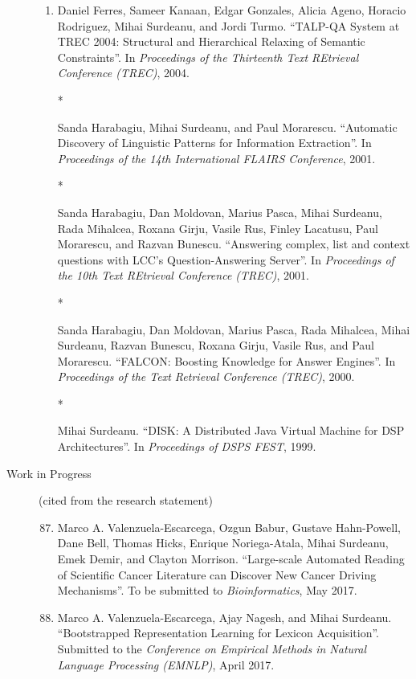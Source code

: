 \documentclass[10pt]{article}
\newcommand{\ve}[1]{{\em #1}} %
\newcommand{\ti}[1]{``#1''} %
\begin{document}
\begin{description}
\begin{enumerate}
\item
Daniel Ferres, Sameer Kanaan, Edgar Gonzales, Alicia Ageno, Horacio Rodriguez, Mihai Surdeanu, and Jordi Turmo.  \ti{TALP-QA System at TREC 2004: Structural and Hierarchical Relaxing of Semantic Constraints}.  In \ve{Proceedings of the Thirteenth Text REtrieval Conference (TREC)}, 2004.

\item
[* \addtocounter{enumi}{1}\theenumi ]
Sanda Harabagiu, Mihai Surdeanu, and Paul Morarescu.  \ti{Automatic Discovery of Linguistic Patterns for Information Extraction}.  In \ve{Proceedings of the 14th International FLAIRS Conference}, 2001.

\item
[* \addtocounter{enumi}{1}\theenumi ]
Sanda Harabagiu, Dan Moldovan, Marius Pasca, Mihai Surdeanu, Rada Mihalcea, Roxana Girju, Vasile Rus, Finley Lacatusu, Paul Morarescu, and Razvan Bunescu.  \ti{Answering complex, list and context questions with LCC's Question-Answering Server}.  In \ve{Proceedings of the 10th Text REtrieval Conference (TREC)}, 2001.

\item
[* \addtocounter{enumi}{1}\theenumi ]
Sanda Harabagiu, Dan Moldovan, Marius Pasca, Rada Mihalcea, Mihai Surdeanu, Razvan Bunescu, Roxana Girju, Vasile Rus, and Paul Morarescu.  \ti{FALCON: Boosting Knowledge for Answer Engines}.  In \ve{Proceedings of the Text Retrieval Conference (TREC)}, 2000. 

\item
[* \addtocounter{enumi}{1}\theenumi ]
Mihai Surdeanu.  \ti{DISK: A Distributed Java Virtual Machine for DSP Architectures}.  In \ve{Proceedings of DSPS FEST}, 1999.


\end{enumerate}


\item [Work in Progress] (cited from the research statement)\
\begin{enumerate}
\setcounter{enumi}{86}

\item 
Marco A. Valenzuela-Escarcega, Ozgun Babur, Gustave Hahn-Powell, Dane Bell, Thomas Hicks, Enrique Noriega-Atala, Mihai Surdeanu, Emek Demir, and Clayton Morrison.  \ti{Large-scale Automated Reading of Scientific Cancer Literature can Discover New  Cancer Driving Mechanisms}. To be submitted to \ve{Bioinformatics}, May 2017.

\item
Marco A. Valenzuela-Escarcega, Ajay Nagesh, and Mihai Surdeanu.  \ti{Bootstrapped Representation Learning for Lexicon Acquisition}.  Submitted to the \ve{Conference on Empirical Methods in Natural Language Processing (EMNLP)}, April 2017.


\end{enumerate}
\end{description}
\end{document}
